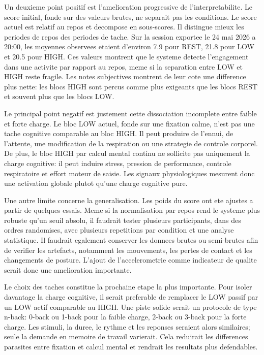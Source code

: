 \documentclass[runningheads]{llncs}
\begin{document}
Un deuxieme point positif est l'amelioration progressive de l'interpretabilite. Le score initial, fonde sur des valeurs brutes, ne separait pas les conditions. Le score actuel est relatif au repos et decompose en sous-scores. Il distingue mieux les periodes de repos des periodes de tache. Sur la session exportee le 24 mai 2026 a 20:00, les moyennes observees etaient d'environ 7.9 pour REST, 21.8 pour LOW et 20.5 pour HIGH. Ces valeurs montrent que le systeme detecte l'engagement dans une activite par rapport au repos, meme si la separation entre LOW et HIGH reste fragile. Les notes subjectives montrent de leur cote une difference plus nette: les blocs HIGH sont percus comme plus exigeants que les blocs REST et souvent plus que les blocs LOW.

Le principal point negatif est justement cette dissociation incomplete entre faible et forte charge. Le bloc LOW actuel, fonde sur une fixation calme, n'est pas une tache cognitive comparable au bloc HIGH. Il peut produire de l'ennui, de l'attente, une modification de la respiration ou une strategie de controle corporel. De plus, le bloc HIGH par calcul mental continu ne sollicite pas uniquement la charge cognitive: il peut induire stress, pression de performance, controle respiratoire et effort moteur de saisie. Les signaux physiologiques mesurent donc une activation globale plutot qu'une charge cognitive pure.

Une autre limite concerne la generalisation. Les poids du score ont ete ajustes a partir de quelques essais. Meme si la normalisation par repos rend le systeme plus robuste qu'un seuil absolu, il faudrait tester plusieurs participants, dans des ordres randomises, avec plusieurs repetitions par condition et une analyse statistique. Il faudrait egalement conserver les donnees brutes ou semi-brutes afin de verifier les artefacts, notamment les mouvements, les pertes de contact et les changements de posture. L'ajout de l'accelerometrie comme indicateur de qualite serait donc une amelioration importante.

Le choix des taches constitue la prochaine etape la plus importante. Pour isoler davantage la charge cognitive, il serait preferable de remplacer le LOW passif par un LOW actif comparable au HIGH. Une piste solide serait un protocole de type n-back: 0-back ou 1-back pour la faible charge, 2-back ou 3-back pour la forte charge. Les stimuli, la duree, le rythme et les reponses seraient alors similaires; seule la demande en memoire de travail varierait. Cela reduirait les differences parasites entre fixation et calcul mental et rendrait les resultats plus defendables.
\end{document}
